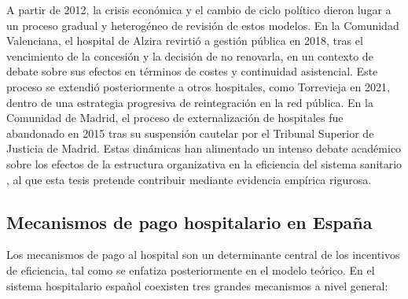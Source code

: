 A partir de 2012, la crisis económica y el cambio de ciclo político 
dieron lugar a un proceso gradual y heterogéneo de revisión de estos 
modelos. En la Comunidad Valenciana, el hospital de Alzira revirtió 
a gestión pública en 2018, tras el vencimiento de la concesión y la 
decisión de no renovarla, en un contexto de debate sobre sus efectos 
en términos de costes y continuidad asistencial. Este proceso se 
extendió posteriormente a otros hospitales, como Torrevieja en 2021, 
dentro de una estrategia progresiva de reintegración en la red 
pública. En la Comunidad de Madrid, el proceso de externalización 
de hospitales fue abandonado en 2015 tras su suspensión cautelar 
por el Tribunal Superior de Justicia de Madrid. Estas dinámicas han 
alimentado un intenso debate académico sobre los efectos de la 
estructura organizativa en la eficiencia del sistema sanitario 
\citep{martin2019eficiencia}, al que esta tesis pretende contribuir 
mediante evidencia empírica rigurosa.
\subsection{Mecanismos de pago hospitalario en España}

Los mecanismos de pago al hospital son un determinante central de los incentivos de eficiencia, tal como se enfatiza posteriormente en el modelo teórico. En el sistema hospitalario español coexisten tres grandes mecanismos a nivel general:

